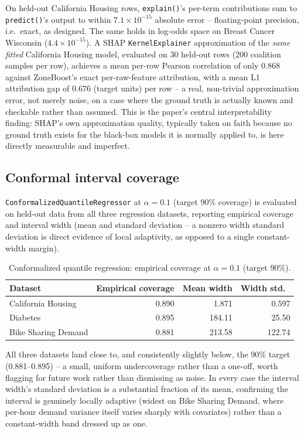 \documentclass[11pt]{article}
\begin{document}
On held-out California Housing rows, \texttt{explain()}'s per-term
contributions sum to \texttt{predict()}'s output to within
$7.1\times10^{-15}$ absolute error -- floating-point precision, i.e.\
exact, as designed. The same holds in log-odds space on Breast Cancer
Wisconsin ($4.4\times10^{-15}$). A SHAP \texttt{KernelExplainer}
approximation of the \emph{same fitted} California Housing model, evaluated
on 30 held-out rows (200 coalition samples per row), achieves a mean
per-row Pearson correlation of only $0.868$ against ZoneBoost's exact
per-raw-feature attribution, with a mean L1 attribution gap of $0.676$
(target units) per row -- a real, non-trivial approximation error, not
merely noise, on a case where the ground truth is actually known and
checkable rather than assumed. This is the paper's central interpretability
finding: SHAP's own approximation quality, typically taken on faith because
no ground truth exists for the black-box models it is normally applied to,
is here directly measurable and imperfect.

\subsection{Conformal interval coverage}
\texttt{ConformalizedQuantileRegressor} at $\alpha=0.1$ (target 90\%
coverage) is evaluated on held-out data from all three regression datasets,
reporting empirical coverage and interval width (mean and standard
deviation -- a nonzero width standard deviation is direct evidence of local
adaptivity, as opposed to a single constant-width margin).

\begin{table}[h]
\centering
\caption{Conformalized quantile regression: empirical coverage at $\alpha=0.1$ (target 90\%).}
\label{tab:conformal}
\begin{tabular}{lrrr}
\toprule
Dataset & Empirical coverage & Mean width & Width std.\ \\
\midrule
California Housing & 0.890 & 1.871 & 0.597 \\
Diabetes & 0.895 & 184.11 & 25.50 \\
Bike Sharing Demand & 0.881 & 213.58 & 122.74 \\
\bottomrule
\end{tabular}
\end{table}

All three datasets land close to, and consistently slightly below, the
90\% target (0.881--0.895) -- a small, uniform undercoverage rather than a
one-off, worth flagging for future work rather than dismissing as noise. In
every case the interval width's standard deviation is a substantial
fraction of its mean, confirming the interval is genuinely locally
adaptive (widest on Bike Sharing Demand, where per-hour demand variance
itself varies sharply with covariates) rather than a constant-width band
dressed up as one.
\end{document}
